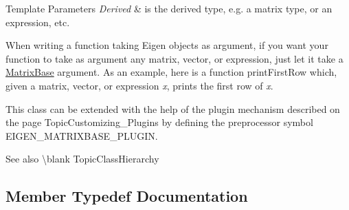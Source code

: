 \begin{DoxyTemplParams}{Template Parameters}
{\em Derived} & is the derived type, e.\+g. a matrix type, or an expression, etc.\\
\hline
\end{DoxyTemplParams}
When writing a function taking Eigen objects as argument, if you want your function to take as argument any matrix, vector, or expression, just let it take a \mbox{\hyperlink{class_eigen_1_1_matrix_base}{Matrix\+Base}} argument. As an example, here is a function print\+First\+Row which, given a matrix, vector, or expression {\itshape x}, prints the first row of {\itshape x}.


\begin{DoxyCode}{0}
\DoxyCodeLine{\{}
\DoxyCodeLine{\}}
\end{DoxyCode}


This class can be extended with the help of the plugin mechanism described on the page Topic\+Customizing\+\_\+\+Plugins by defining the preprocessor symbol {\ttfamily E\+I\+G\+E\+N\+\_\+\+M\+A\+T\+R\+I\+X\+B\+A\+S\+E\+\_\+\+P\+L\+U\+G\+IN}.

\begin{DoxySeeAlso}{See also}
\textbackslash{}blank Topic\+Class\+Hierarchy 
\end{DoxySeeAlso}


\subsection{Member Typedef Documentation}
\mbox{\label{class_eigen_1_1_matrix_base_a3cf75a9110a1a28c493e124c8a7fcade}} 
